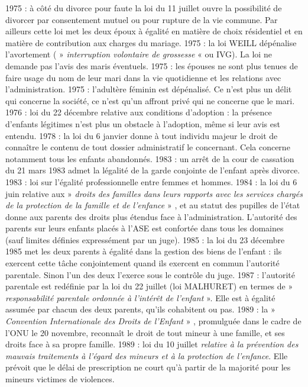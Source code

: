 1975 : à côté du divorce pour faute la loi du 11 juillet ouvre la possibilité de divorcer par consentement mutuel ou pour rupture de la vie commune. Par ailleurs cette loi met les deux époux à égalité en matière de choix résidentiel et en matière de contribution aux charges du mariage.
 1975 : la loi WEILL dépénalise l'avortement ( » \emph{interruption volontaire de grossesse} « ou IVG). La loi ne demande pas l'avis des maris éventuels.
 1975 : les épouses ne sont plus tenues de faire usage du nom de leur mari dans la vie quotidienne et les relations avec l'administration.
 1975 : l'adultère féminin est dépénalisé. Ce n'est plus un délit qui concerne la société, ce n'est qu'un affront privé qui ne concerne que le mari.
 1976 : loi du 22 décembre relative aux conditions d'adoption : la présence d'enfants légitimes n'est plus un obstacle à l'adoption, même si leur avis est entendu. 
 1978 : la loi du 6 janvier donne à tout individu majeur le droit de connaître le contenu de tout dossier administratif le concernant. Cela concerne notamment tous les enfants abandonnés.
 1983 : un arrêt de la cour de cassation du 21 mars 1983 admet la légalité de la garde conjointe de l'enfant après divorce.
 1983 : loi sur l'égalité professionnelle entre femmes et hommes.
 1984 : la loi du 6 juin relative aux » \emph{droits des familles dans leurs rapports avec les services chargés de la protection de la famille et de l'enfance} » , et au statut des pupilles de l'état donne aux parents des droits plus étendus face à l'administration. L'autorité des parents sur leurs enfants placés à l'ASE est confortée dans tous les domaines (sauf limites définies expressément par un juge).
 1985 : la loi du 23 décembre 1985 met les deux parents à égalité dans la gestion des biens de l'enfant : ils exercent cette tâche conjointement quand ils exercent en commun l'autorité parentale. Sinon l'un des deux l'exerce sous le contrôle du juge.
 1987 : l'autorité parentale est redéfinie par la loi du 22 juillet (loi MALHURET) en termes de » \emph{responsabilité parentale ordonnée à l'intérêt de l'enfant} ». Elle est à égalité assumée par chacun des deux parents, qu'ils cohabitent ou pas.
 1989 : la »\emph{ Convention Internationale des Droits de l'Enfant} » , promulguée dans le cadre de l'ONU le 20 novembre, reconnaît le droit de tout mineur à une famille, et ses droits face à sa propre famille.
 1989 : loi du 10 juillet \emph{relative à la prévention des mauvais traitements à l'égard des mineurs et à la protection de l'enfance}. Elle prévoit que le délai de prescription ne court qu'à partir de la majorité pour les mineurs victimes de violences.
